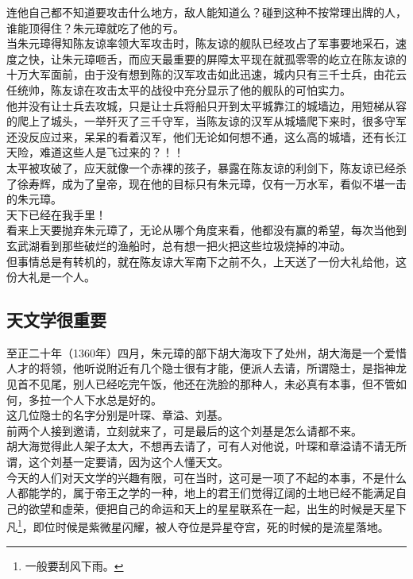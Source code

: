 \begin{multicols}{\theparacolNo}
连他自己都不知道要攻击什么地方，敌人能知道么？碰到这种不按常理出牌的人，谁能顶得住？朱元璋就吃了他的亏。\\

当朱元璋得知陈友谅率领大军攻击时，陈友谅的舰队已经攻占了军事要地采石，速度之快，让朱元璋咂舌，而应天最重要的屏障太平现在就孤零零的屹立在陈友谅的十万大军面前，由于没有想到陈的汉军攻击如此迅速，城内只有三千士兵，由花云任统帅，陈友谅在攻击太平的战役中充分显示了他的舰队的可怕实力。\\

他并没有让士兵去攻城，只是让士兵将船只开到太平城靠江的城墙边，用短梯从容的爬上了城头，一举歼灭了三千守军，当陈友谅的汉军从城墙爬下来时，很多守军还没反应过来，呆呆的看着汉军，他们无论如何想不通，这么高的城墙，还有长江天险，难道这些人是飞过来的？！！\\

太平被攻破了，应天就像一个赤裸的孩子，暴露在陈友谅的利剑下，陈友谅已经杀了徐寿辉，成为了皇帝，现在他的目标只有朱元璋，仅有一万水军，看似不堪一击的朱元璋。\\

天下已经在我手里！\\

看来上天要抛弃朱元璋了，无论从哪个角度来看，他都没有赢的希望，每次当他到玄武湖看到那些破烂的渔船时，总有想一把火把这些垃圾烧掉的冲动。\\

但事情总是有转机的，就在陈友谅大军南下之前不久，上天送了一份大礼给他，这份大礼是一个人。\\

\subsection{天文学很重要}
至正二十年（1360年）四月，朱元璋的部下胡大海攻下了处州，胡大海是一个爱惜人才的将领，他听说附近有几个隐士很有才能，便派人去请，所谓隐士，是指神龙见首不见尾，别人已经吃完午饭，他还在洗脸的那种人，未必真有本事，但不管如何，多拉一个人下水总是好的。\\

这几位隐士的名字分别是叶琛、章溢、刘基。\\

前两个人接到邀请，立刻就来了，可是最后的这个刘基是怎么请都不来。\\

胡大海觉得此人架子太大，不想再去请了，可有人对他说，叶琛和章溢请不请无所谓，这个刘基一定要请，因为这个人懂天文。\\

今天的人们对天文学的兴趣有限，可在当时，这可是一项了不起的本事，不是什么人都能学的，属于帝王之学的一种，地上的君王们觉得辽阔的土地已经不能满足自己的欲望和虚荣，便把自己的命运和天上的星星联系在一起，出生的时候是天星下凡\footnote{一般要刮风下雨。}，即位时候是紫微星闪耀，被人夺位是异星夺宫，死的时候的是流星落地。\\


\end{multicols}
